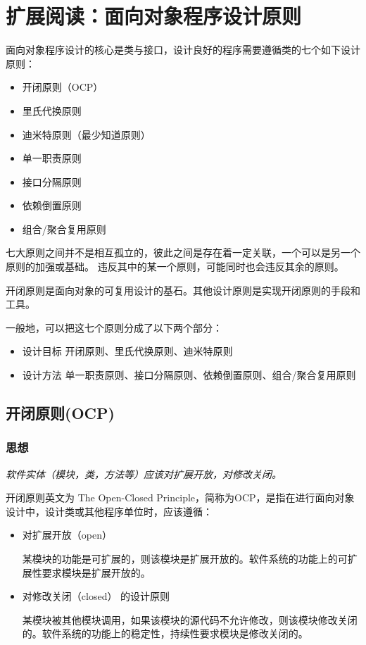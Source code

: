 \section{扩展阅读：面向对象程序设计原则}

面向对象程序设计的核心是类与接口，设计良好的程序需要遵循类的七个如下设计原则：

\begin{itemize}
	\item 开闭原则（OCP）
	\item 里氏代换原则
	\item 迪米特原则（最少知道原则）
	\item 单一职责原则
	\item 接口分隔原则
	\item 依赖倒置原则
	\item 组合/聚合复用原则
\end{itemize}

七大原则之间并不是相互孤立的，彼此之间是存在着一定关联，一个可以是另一个原则的加强或基础。
违反其中的某一个原则，可能同时也会违反其余的原则。

开闭原则是面向对象的可复用设计的基石。其他设计原则是实现开闭原则的手段和工具。

一般地，可以把这七个原则分成了以下两个部分：
\begin{itemize}
	\item 设计目标
	开闭原则、里氏代换原则、迪米特原则
	\item 设计方法
	单一职责原则、接口分隔原则、依赖倒置原则、组合/聚合复用原则
\end{itemize}


\subsection{开闭原则(OCP)}

\subsubsection{思想}
\emph{ 软件实体（模块，类，方法等）应该对扩展开放，对修改关闭。}

开闭原则英文为 The Open-Closed Principle，简称为OCP，是指在进行面向对象设计中，设计类或其他程序单位时，应该遵循：

\begin{itemize}

    \item 对扩展开放（open）

	某模块的功能是可扩展的，则该模块是扩展开放的。软件系统的功能上的可扩展性要求模块是扩展开放的。
    
    \item 对修改关闭（closed） 的设计原则

	某模块被其他模块调用，如果该模块的源代码不允许修改，则该模块修改关闭的。软件系统的功能上的稳定性，持续性要求模块是修改关闭的。

\end{itemize}

